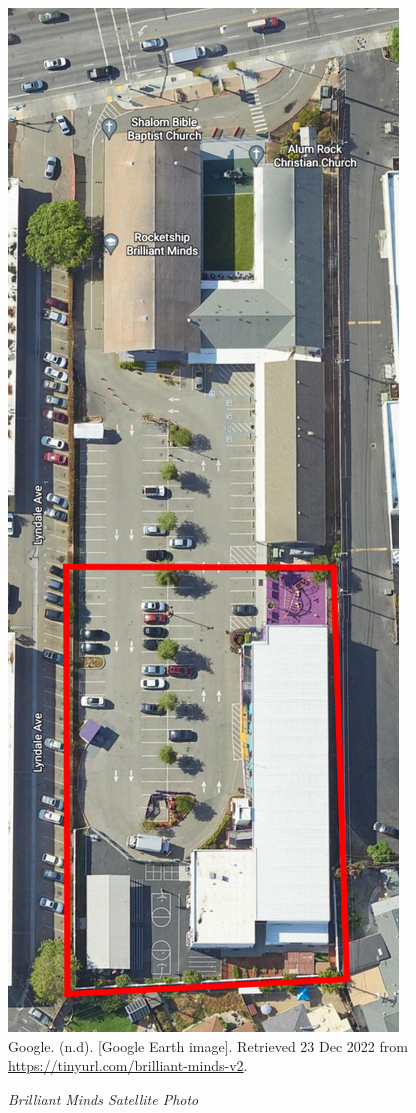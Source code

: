 \begin{figure}[hbt]
  \centering
  \caption[Brilliant Minds Satellite Photo]{\textit{Brilliant Minds Satellite Photo}}\label{fig:brilliant-minds-sat-photo}
  \includegraphics[height=0.9\textheight]{Satellite-Photos/brilliant-minds-sat-photo}\\ %
  \footnotesize{Google. (n.d). [Google Earth image]. Retrieved 23 Dec 2022 from \url{https://tinyurl.com/brilliant-minds-v2}.}
\end{figure}

